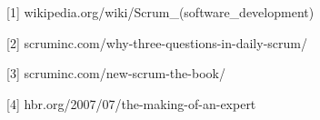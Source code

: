 \documentclass[12pt]{article}%
\begin{document}
\hspace{3.6cm} [1] 
\hspace{1mm} wikipedia.org/wiki/Scrum\_(software\_development)

\hspace{3cm} [2] 
\hspace{1mm} scruminc.com/why-three-questions-in-daily-scrum/

\hspace{3cm} [3] 
\hspace{1mm} scruminc.com/new-scrum-the-book/

\hspace{3cm} [4] 
\hspace{1mm} hbr.org/2007/07/the-making-of-an-expert
\end{document}
